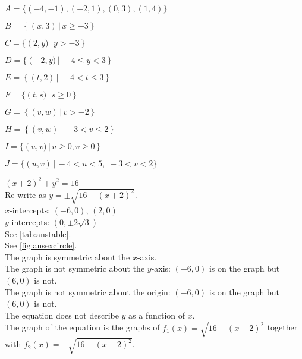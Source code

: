 \begin{exenum}
\begin{mfigure}
\caption{}
\label{fig:ansextwenty}
\end{mfigure}

\item $A = \{(-4, -1),  (-2, 1),  (0, 3), (1, 4)\}$
\item $B = \left\{ \left(x,3 \right) \, | \, x \geq -3 \right\}$
\item $C = \{ \left(2,y) \, | \, y > -3 \right\}$
\item $D = \{ \left(-2,y) \, | \, -4 \leq y < 3 \right\}$
\item $E = \left\{ \left(t,2 \right) \, | \, -4 < t \leq 3 \right\}$
\item $F = \{ \left(t,s) \, | \, s \geq 0 \right\}$
\item $G = \left\{ \left(v,w \right) \, | \, v > -2 \right\}$
\item $H = \left\{ \left(v,w\right) \, | \, -3 < v \leq 2 \right\}$
\item $I = \{ \left(u,v) \, | \, u \geq 0, \! v \geq 0\right\}$
\item $J = \{(u, v) \, | \, -4 < u < 5, \; -3 < v < 2\}$

\addtocounter{enumi}{4}

\item

$(x+2)^2+y^2=16$ \\ Re-write as $y = \pm \sqrt{16-(x+2)^2}$.\\
$x$-intercepts: $(-6, 0)$, $(2,0)$\\
$y$-intercepts: $\left(0, \pm 2\sqrt{3}\right)$\\
See \autoref{tab:anstable}.\\
See \autoref{fig:ansexcircle}.\\
The graph is symmetric about the $x$-axis.\\
The graph is not symmetric about the $y$-axis:  $(-6, 0)$ is on the graph but $(6, 0)$ is not.\\
The graph is not symmetric about the origin:  $(-6, 0)$ is on the graph but $(6, 0)$ is not.\\
The equation does not describe $y$ as a function of $x$.\\
The graph of the equation is the graphs of $f_{1}(x) = \sqrt{16-(x+2)^2}$ together with $f_{2}(x) = -\sqrt{16-(x+2)^2}$.

\end{exenum}

